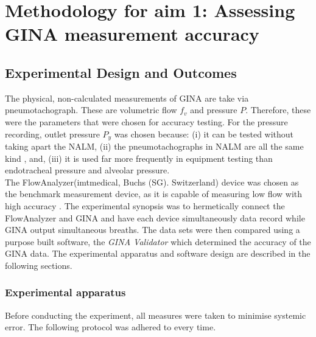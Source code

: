 \documentclass[12pt, openany, oneside]{book}
\begin{document}
\section{Methodology for aim 1: Assessing GINA measurement accuracy}
\subsection{Experimental Design and Outcomes}
The physical, non-calculated measurements of GINA are take via pneumotachograph. These are volumetric flow $f_v$ and pressure $P$. Therefore, these were the parameters that were chosen for accuracy testing. For the pressure recording, outlet pressure $P_y$ was chosen because: (i) it can be tested without taking apart the NALM, (ii) the pneumotachographs in NALM are all the same kind \citep{gina}, and, (iii) it is used far more frequently in equipment testing than endotracheal pressure and alveolar pressure. \\

The FlowAnalyzer\texttrademark  (imtmedical, Buchs (SG). Switzerland) device was chosen as the benchmark measurement device, as it is capable of measuring low flow with high accuracy \citep{flow}. The experimental synopsis was to hermetically connect the FlowAnalyzer and GINA and have each device simultaneously data record while GINA output simultaneous breaths. The data sets were then compared using a purpose built software, the \textit{GINA Validator} which determined the accuracy of the GINA data. The experimental apparatus and software design are described in the following sections.

\subsubsection{Experimental apparatus}
Before conducting the experiment, all measures were taken to minimise systemic error. The following protocol was adhered to every time.
\end{document}
